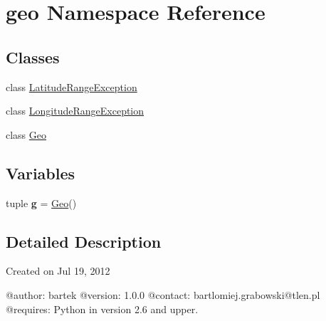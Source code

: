 \hypertarget{namespacegeo}{
\section{geo Namespace Reference}
\label{namespacegeo}
}
\subsection*{Classes}
\begin{DoxyCompactItemize}
\item 
class \hyperlink{classgeo_1_1LatitudeRangeException}{LatitudeRangeException}
\item 
class \hyperlink{classgeo_1_1LongitudeRangeException}{LongitudeRangeException}
\item 
class \hyperlink{classgeo_1_1Geo}{Geo}
\end{DoxyCompactItemize}
\subsection*{Variables}
\begin{DoxyCompactItemize}
\item 
\hypertarget{namespacegeo_af7a7146eb0d4d37cacb1e44f9b45f582}{
tuple {\bfseries g} = \hyperlink{classgeo_1_1Geo}{Geo}()}
\label{namespacegeo_af7a7146eb0d4d37cacb1e44f9b45f582}

\end{DoxyCompactItemize}


\subsection{Detailed Description}
\begin{DoxyVerb}
Created on Jul 19, 2012

@author: bartek
@version: 1.0.0
@contact: bartlomiej.grabowski@tlen.pl
@requires: Python in version 2.6 and upper.
\end{DoxyVerb}
 